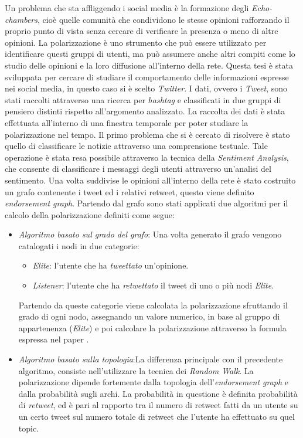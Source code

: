\begin{spacing}{1.0}
Un problema che sta affliggendo i social media è la formazione degli \textit{Echo-chambers}, cioè quelle comunità che condividono le stesse opinioni rafforzando il proprio punto di vista senza cercare di verificare la presenza o meno di altre opinioni. La polarizzazione è uno strumento che può essere utilizzato per identificare questi gruppi di utenti, ma può assumere anche altri compiti come lo studio delle opinioni e la loro diffusione all'interno della rete.
Questa tesi è stata sviluppata per cercare di studiare il comportamento delle informazioni espresse nei social media, in questo caso si è scelto \textit{Twitter}. 
I dati, ovvero i \textit{Tweet}, sono stati raccolti attraverso una ricerca per \textit{hashtag} e classificati in due gruppi di pensiero distinti rispetto all'argomento analizzato.
La raccolta dei dati è stata effettuata all'interno di una finestra temporale per poter studiare la polarizzazione nel tempo.
Il primo problema che si è cercato di risolvere è stato quello di classificare le notizie attraverso una comprensione testuale. Tale operazione è stata resa possibile attraverso la tecnica della \textit{Sentiment Analysis}, che consente di classificare i messaggi degli utenti attraverso un'analisi del sentimento. 
Una volta suddivise le opinioni all'interno della rete è stato costruito un grafo contenente i tweet ed i relativi retweet, questo viene definito \textit{endorsement graph}.
Partendo dal grafo sono stati applicati due algoritmi per il calcolo della polarizzazione definiti come segue:
\begin{itemize}
\item \textit{Algoritmo basato sul grado del grafo}: Una volta generato il grafo vengono catalogati i nodi in due categorie:
\begin{itemize}
\item \textit{Elite}: l'utente che ha \textit{tweettato} un'opinione.
\item \textit{Listener}: l'utente che ha \textit{retwettato} il tweet di uno o più nodi \textit{Elite}.
\end{itemize}
Partendo da queste categorie viene calcolata la polarizzazione sfruttando il grado di ogni nodo, assegnando un valore numerico, in base al gruppo di appartenenza (\textit{Elite}) e poi calcolare la polarizzazione attraverso la formula espressa nel paper \cite{morales2015polarization}.
\item \textit{Algoritmo basato sulla topologia}:La differenza principale con il precedente algoritmo, consiste nell'utilizzare la tecnica dei \textit{Random Walk}. La polarizzazione dipende fortemente dalla topologia dell'\textit{endorsement graph} e dalla probabilità sugli archi. La probabilità in questione è definita probabilità di \textit{retweet}, ed è pari al rapporto tra il numero di retweet fatti da un utente su un certo tweet sul numero totale di retweet che l'utente ha effettuato su quel topic. 

\end{itemize}
\end{spacing}
